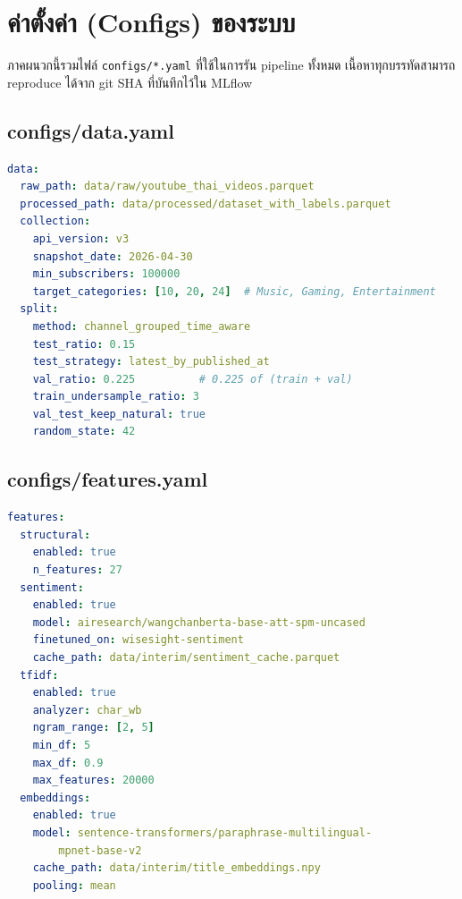 \chapter{ค่าตั้งค่า (Configs) ของระบบ}
\label{app:configs}

ภาคผนวกนี้รวมไฟล์ \texttt{configs/*.yaml} ที่ใช้ในการรัน pipeline ทั้งหมด
เนื้อหาทุกบรรทัดสามารถ reproduce ได้จาก git SHA ที่บันทึกไว้ใน MLflow

\section{configs/data.yaml}
\begin{lstlisting}[language=yaml,caption={configs/data.yaml -- การกำหนดแหล่งข้อมูลและการแบ่ง},label={lst:cfg-data}]
data:
  raw_path: data/raw/youtube_thai_videos.parquet
  processed_path: data/processed/dataset_with_labels.parquet
  collection:
    api_version: v3
    snapshot_date: 2026-04-30
    min_subscribers: 100000
    target_categories: [10, 20, 24]  # Music, Gaming, Entertainment
  split:
    method: channel_grouped_time_aware
    test_ratio: 0.15
    test_strategy: latest_by_published_at
    val_ratio: 0.225          # 0.225 of (train + val)
    train_undersample_ratio: 3
    val_test_keep_natural: true
    random_state: 42
\end{lstlisting}

\section{configs/features.yaml}
\begin{lstlisting}[language=yaml,caption={configs/features.yaml -- การออกแบบฟีเจอร์},label={lst:cfg-features}]
features:
  structural:
    enabled: true
    n_features: 27
  sentiment:
    enabled: true
    model: airesearch/wangchanberta-base-att-spm-uncased
    finetuned_on: wisesight-sentiment
    cache_path: data/interim/sentiment_cache.parquet
  tfidf:
    enabled: true
    analyzer: char_wb
    ngram_range: [2, 5]
    min_df: 5
    max_df: 0.9
    max_features: 20000
  embeddings:
    enabled: true
    model: sentence-transformers/paraphrase-multilingual-
        mpnet-base-v2
    cache_path: data/interim/title_embeddings.npy
    pooling: mean
\end{lstlisting}

